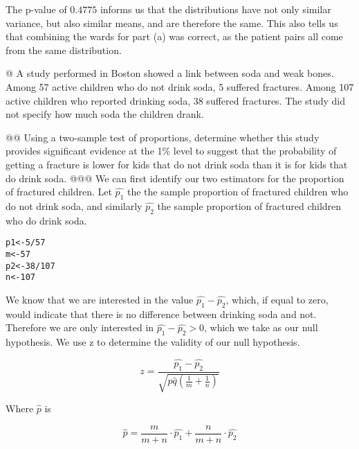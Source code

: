 \documentclass[10pt]{article}\usepackage[]{graphicx}\usepackage[]{xcolor}
\makeatletter
\newcommand{\hlnum}[1]{\textcolor[rgb]{0.686,0.059,0.569}{#1} }%
\newcommand{\hlopt}[1]{\textcolor[rgb]{0,0,0}{#1} }%
\newcommand{\hlstd}[1]{\textcolor[rgb]{0.345,0.345,0.345}{#1} }%
\newcommand{\hlkwb}[1]{\textcolor[rgb]{0.69,0.353,0.396}{#1} }%
\newenvironment{kframe}{%
 \def\at@end@of@kframe{}%
 \ifinner\ifhmode%
  \def\at@end@of@kframe{\end{minipage} }%
  \begin{minipage}{\columnwidth}%
 \fi\fi%
 \def\FrameCommand##1{\hskip\@totalleftmargin \hskip-\fboxsep
 \colorbox{shadecolor}{##1}\hskip-\fboxsep
     \hskip-\linewidth \hskip-\@totalleftmargin \hskip\columnwidth}%
 \MakeFramed {\advance\hsize-\width
   \@totalleftmargin\z@ \linewidth\hsize
   \@setminipage} }%
 {\par\unskip\endMakeFramed%
 \at@end@of@kframe}
\newenvironment{knitrout}{}{} %
\makeatother
\begin{document}
\begin{easylist}[enumerate]
    The p-value of $0.4775$ informs us that the distributions have not only similar variance, but also similar means,
    and are therefore the same. This also tells us that combining the wards for part (a) was correct, as the patient
    pairs all come from the same distribution.

    @ A study performed in Boston showed a link between soda and weak bones. Among 57 active children who do not drink
    soda, 5 suffered fractures. Among 107 active children who reported drinking soda, 38 suffered fractures. The study
    did not specify how much soda the children drank.

    @@ Using a two-sample test of proportions, determine whether this study provides significant evidence at the 1\%
    level to suggest that the probability of getting a fracture is lower for kids that do not drink soda than it is for
    kids that do drink soda.
    @@@ We can first identify our two estimators for the proportion of fractured children. Let $\hat{p_1}$ the the
    sample proportion of fractured children who do not drink soda, and similarly $\hat{p_2}$ the sample proportion of
    fractured children who do drink soda.

\begin{knitrout}
\color{fgcolor}\begin{kframe}
\begin{alltt}
             \hlstd{p1} \hlkwb{<-} \hlnum{5} \hlopt{/} \hlnum{57}
             \hlstd{m}  \hlkwb{<-} \hlnum{57}
             \hlstd{p2} \hlkwb{<-} \hlnum{38} \hlopt{/} \hlnum{107}
             \hlstd{n}  \hlkwb{<-} \hlnum{107}
\end{alltt}
\end{kframe}
\end{knitrout}


    We know that we are interested in the value $\hat{p_1} - \hat{p_2}$, which, if equal to zero, would indicate that
    there is no difference between drinking soda and not. Therefore we are only interested in $\hat{p_1} - \hat{p_2} >
    0$, which we take as our null hypothesis. We use z to determine the validity of our null hypothesis.

    \[
        z = \frac{\hat{p_1} - \hat{p_2} }{\sqrt{\hat{p}\hat{q} \left( \frac{1}{m} + \frac{1}{n} \right)} }
    \]

    Where $\hat{p}$ is

    \[
        \hat{p} = \frac{m}{m + n} \cdot \hat{p_1} + \frac{n}{m + n} \cdot \hat{p_2}
    \]


\end{easylist}
\end{document}
